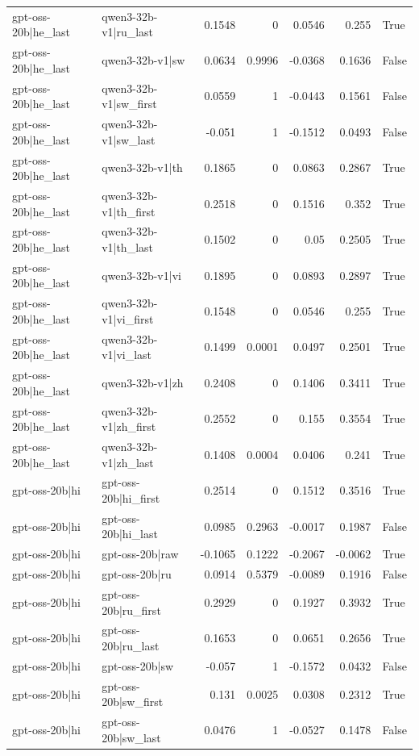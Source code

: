 \begin{table}
\begin{tabular}{l l r r r r l}
gpt-oss-20b|he_last & qwen3-32b-v1|ru_last & 0.1548 & 0 & 0.0546 & 0.255 & True \\
gpt-oss-20b|he_last & qwen3-32b-v1|sw & 0.0634 & 0.9996 & -0.0368 & 0.1636 & False \\
gpt-oss-20b|he_last & qwen3-32b-v1|sw_first & 0.0559 & 1 & -0.0443 & 0.1561 & False \\
gpt-oss-20b|he_last & qwen3-32b-v1|sw_last & -0.051 & 1 & -0.1512 & 0.0493 & False \\
gpt-oss-20b|he_last & qwen3-32b-v1|th & 0.1865 & 0 & 0.0863 & 0.2867 & True \\
gpt-oss-20b|he_last & qwen3-32b-v1|th_first & 0.2518 & 0 & 0.1516 & 0.352 & True \\
gpt-oss-20b|he_last & qwen3-32b-v1|th_last & 0.1502 & 0 & 0.05 & 0.2505 & True \\
gpt-oss-20b|he_last & qwen3-32b-v1|vi & 0.1895 & 0 & 0.0893 & 0.2897 & True \\
gpt-oss-20b|he_last & qwen3-32b-v1|vi_first & 0.1548 & 0 & 0.0546 & 0.255 & True \\
gpt-oss-20b|he_last & qwen3-32b-v1|vi_last & 0.1499 & 0.0001 & 0.0497 & 0.2501 & True \\
gpt-oss-20b|he_last & qwen3-32b-v1|zh & 0.2408 & 0 & 0.1406 & 0.3411 & True \\
gpt-oss-20b|he_last & qwen3-32b-v1|zh_first & 0.2552 & 0 & 0.155 & 0.3554 & True \\
gpt-oss-20b|he_last & qwen3-32b-v1|zh_last & 0.1408 & 0.0004 & 0.0406 & 0.241 & True \\
gpt-oss-20b|hi & gpt-oss-20b|hi_first & 0.2514 & 0 & 0.1512 & 0.3516 & True \\
gpt-oss-20b|hi & gpt-oss-20b|hi_last & 0.0985 & 0.2963 & -0.0017 & 0.1987 & False \\
gpt-oss-20b|hi & gpt-oss-20b|raw & -0.1065 & 0.1222 & -0.2067 & -0.0062 & True \\
gpt-oss-20b|hi & gpt-oss-20b|ru & 0.0914 & 0.5379 & -0.0089 & 0.1916 & False \\
gpt-oss-20b|hi & gpt-oss-20b|ru_first & 0.2929 & 0 & 0.1927 & 0.3932 & True \\
gpt-oss-20b|hi & gpt-oss-20b|ru_last & 0.1653 & 0 & 0.0651 & 0.2656 & True \\
gpt-oss-20b|hi & gpt-oss-20b|sw & -0.057 & 1 & -0.1572 & 0.0432 & False \\
gpt-oss-20b|hi & gpt-oss-20b|sw_first & 0.131 & 0.0025 & 0.0308 & 0.2312 & True \\
gpt-oss-20b|hi & gpt-oss-20b|sw_last & 0.0476 & 1 & -0.0527 & 0.1478 & False \\

\end{tabular}
\end{table}
